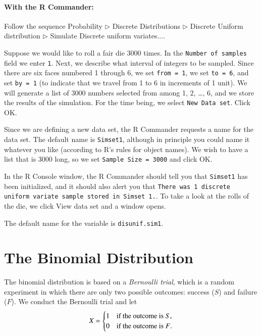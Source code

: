 \documentclass[captions=tableheading]{scrbook}
\begin{document}
\paragraph*{With the \textsf{R} Commander:}

Follow the sequence \textsf{Probability \(\triangleright\) Discrete Distributions \(\triangleright\) Discrete Uniform distribution \(\triangleright\) Simulate Discrete uniform variates.}...

Suppose we would like to roll a fair die 3000 times. In the \texttt{Number of samples} field we enter \texttt{1}. Next, we describe what interval of integers to be sampled. Since there are six faces numbered 1 through 6, we set \texttt{from = 1}, we set \texttt{to = 6}, and set \texttt{by = 1} (to indicate that we travel from 1 to 6 in increments of 1 unit). We will generate a list of 3000 numbers selected from among 1, 2, \ldots{}, 6, and we store the results of the simulation. For the time being, we select \texttt{New Data set}. Click \textsf{OK}.

Since we are defining a new data set, the \textsf{R} Commander requests a name for the data set. The default name is \texttt{Simset1}, although in principle you could name it whatever you like (according to \textsf{R}'s rules for object names). We wish to have a list that is 3000 long, so we set \texttt{Sample Size = 3000} and click \textsf{OK}.

In the \textsf{R} Console window, the \textsf{R} Commander should tell you that \texttt{Simset1} has been initialized, and it should also alert you that \texttt{There was 1 discrete uniform variate sample stored in Simset 1.}. To take a look at the rolls of the die, we click \textsf{View data set} and a window opens.  

The default name for the variable is \texttt{disunif.sim1}.
\section{The Binomial Distribution}
\label{sec-1-3}

\label{sec:binom-dist}

The binomial distribution is based on a \emph{Bernoulli trial}, which is a random experiment in which there are only two possible outcomes: success (\(S\)) and failure (\(F\)). We conduct the Bernoulli trial and let 
\begin{equation}
X=
\begin{cases}
1 & \mbox{if the outcome is \ensuremath{S}},\\
0 & \mbox{if the outcome is \ensuremath{F}}.
\end{cases}
\end{equation}
\end{document}
